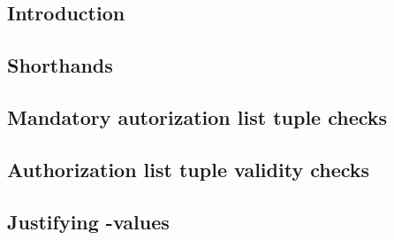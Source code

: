 \subsection{Introduction                                  }  \label{rlp auth: comparisons: intro}                        %
\subsection{Shorthands                                    }  \label{rlp auth: comparisons: shorthands}                   %
\subsection{Mandatory autorization list tuple checks      }  \label{rlp auth: comparisons: mandatory checks}             %
\subsection{Authorization list tuple validity checks      }  \label{rlp auth: comparisons: validity checks}              %
\subsection{Justifying \externPerspectivePrefix-values    }  \label{rlp auth: comparisons: justifying extern values}     %
